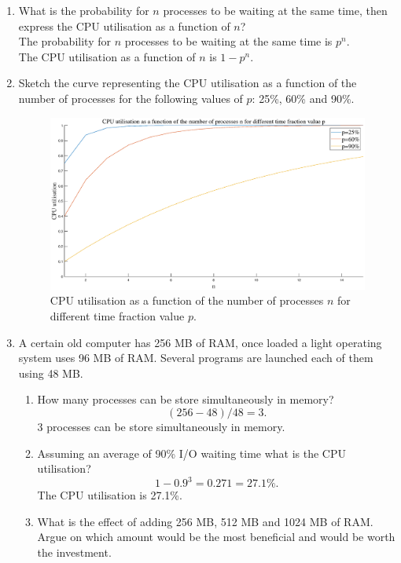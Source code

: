 \documentclass[a4paper]{article}
\begin{document}
\begin{enumerate}
    \item What is the probability for $n$ processes to be waiting at the same time, then express the CPU utilisation as a function of $n$?\\
    The probability for $n$ processes to be waiting at the same time is $p^n$.\\
    The CPU utilisation as a function of $n$ is $1-p^n$.\\
    \item Sketch the curve representing the CPU utilisation as a function of the number of processes for the following values of $p$: 25\%, 60\% and 90\%.
    \begin{figure}[H]
        \centering
        \includegraphics[width=1\textwidth]{1.eps}
        \caption{CPU utilisation as a function of the number of processes $n$ for different time fraction value $p$.}
    \end{figure}
    \item A certain old computer has 256 MB of RAM, once loaded a light operating system uses 96 MB of RAM. Several programs are launched each of them using 48 MB.
    \begin{enumerate}
        \item How many processes can be store simultaneously in memory?\\
        \[(256-48)/48=3.\]
        3 processes can be store simultaneously in memory.
        \item Assuming an average of 90\% I/O waiting time what is the CPU utilisation?\\
        \[1-0.9^3=0.271=27.1\%.\]
        The CPU utilisation is 27.1\%.
        \item What is the effect of adding 256 MB, 512 MB and 1024 MB of RAM. Argue on which amount would be the most beneficial and would be worth the investment.\\

\end{enumerate}
\end{enumerate}
\end{document}
